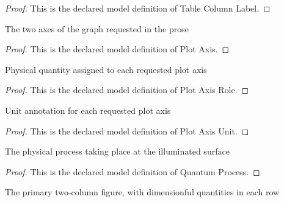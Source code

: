 \begin{proof}
  This is the declared model definition of Table Column Label.
\end{proof}
\begin{definition}
  \label{def:physics:phyx-mini-0516:phyxminiproblems-problemphyxmini0516-plotaxis}
  The two axes of the graph requested in the prose
\end{definition}
\begin{proof}
  This is the declared model definition of Plot Axis.
\end{proof}
\begin{definition}
  \label{def:physics:phyx-mini-0516:phyxminiproblems-problemphyxmini0516-plotaxisrole}
  Physical quantity assigned to each requested plot axis
\end{definition}
\begin{proof}
  This is the declared model definition of Plot Axis Role.
\end{proof}
\begin{definition}
  \label{def:physics:phyx-mini-0516:phyxminiproblems-problemphyxmini0516-plotaxisunit}
  Unit annotation for each requested plot axis
\end{definition}
\begin{proof}
  This is the declared model definition of Plot Axis Unit.
\end{proof}
\begin{definition}
  \label{def:physics:phyx-mini-0516:phyxminiproblems-problemphyxmini0516-quantumprocess}
  The physical process taking place at the illuminated surface
\end{definition}
\begin{proof}
  This is the declared model definition of Quantum Process.
\end{proof}
\begin{definition}
  \label{def:physics:phyx-mini-0516:phyxminiproblems-problemphyxmini0516-stoppingpotentialtablefigure}
  The primary two-column figure, with dimensionful quantities in each row
\end{definition}
